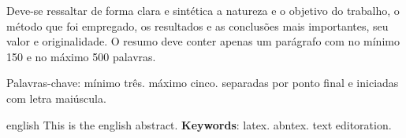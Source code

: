 \documentclass[
	10pt,			 	  %
	oneside,
	a4paper,			  %
	chapter=TITLE,		  %
	english,			 %
	brazil				 %
	]{abntex2}
\begin{document}
\setlength{\absparsep}{18pt} %
\begin{resumo}
	Deve-se ressaltar de forma clara e sintética a natureza e o objetivo do trabalho, o método que foi empregado, os resultados e as conclusões mais importantes, seu valor e originalidade. O resumo deve conter apenas um parágrafo com no mínimo 150 e no máximo 500 palavras.
	
	Palavras-chave: mínimo três. máximo cinco. separadas por ponto final e iniciadas com letra maiúscula.
\end{resumo}

\begin{resumo}[Abstract]
	\begin{otherlanguage*}{english}
		This is the english abstract.
		\vspace{\onelineskip}
		\noindent 
		\textbf{Keywords}: latex. abntex. text editoration.
	\end{otherlanguage*}
\end{resumo}

\listoffigures*
\cleardoublepage
\listoftables*
\cleardoublepage



\cleardoublepage

\tableofcontents*
\cleardoublepage
\end{document}
